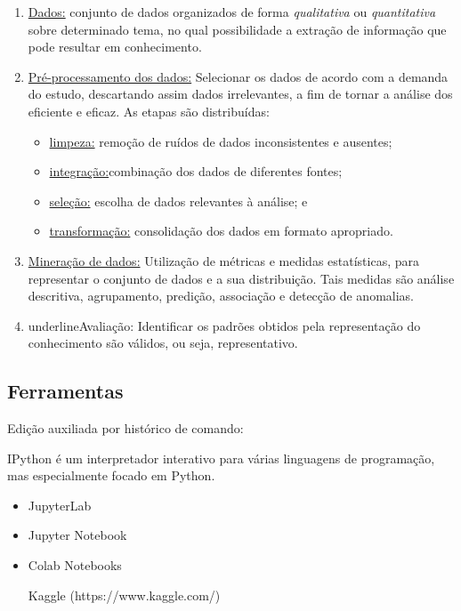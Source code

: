 \begin{enumerate}
	\item \underline{Dados:}
	      conjunto de dados organizados de forma \textit{qualitativa} ou \textit{quantitativa} sobre determinado tema, no qual possibilidade a extração de informação que pode resultar em conhecimento.
	\item \underline{Pré-processamento dos dados:}
	      Selecionar os dados de acordo com a demanda do estudo, descartando assim dados irrelevantes, a fim de tornar a análise dos eficiente e eficaz.
	      As etapas são distribuídas:
	      \begin{itemize}
		      \item \underline{limpeza:} remoção de ruídos de dados inconsistentes e ausentes;
		      \item \underline{integração:}combinação dos dados de diferentes fontes;
		      \item \underline{seleção:} escolha de dados relevantes à análise; e
		      \item \underline{transformação:} consolidação dos dados em formato apropriado.
	      \end{itemize}
	\item \underline{Mineração de dados:}
	      Utilização de métricas e medidas estatísticas, para representar o conjunto de dados e a sua distribuição.
	      Tais medidas são análise descritiva, agrupamento, predição, associação e detecção de anomalias.
	\item underline{Avaliação:}
	      Identificar os padrões obtidos pela representação do conhecimento são válidos, ou seja, representativo.
\end{enumerate}


\subsection{Ferramentas}

Edição auxiliada por histórico de comando:

IPython é um interpretador interativo para várias linguagens de programação, mas especialmente focado em Python.

\begin{itemize}
	\item JupyterLab
	\item Jupyter Notebook
	\item Colab Notebooks
	\item [Kaggle](https://www.kaggle.com/)
\end{itemize}


